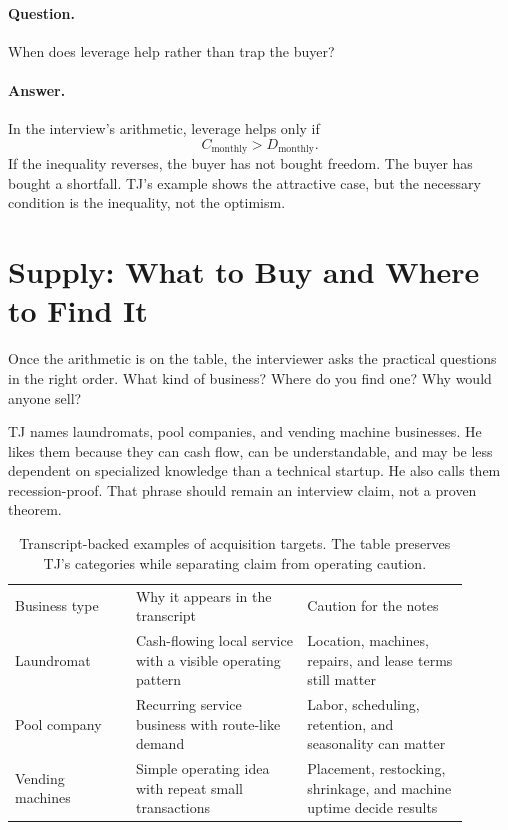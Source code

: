 \paragraph{Question.} When does leverage help rather than trap the buyer?

\paragraph{Answer.} In the interview's arithmetic, leverage helps only if
\begin{equation}
C_{\mathrm{monthly}}>D_{\mathrm{monthly}}.
\end{equation}
If the inequality reverses, the buyer has not bought freedom. The buyer has bought a shortfall. TJ's example shows the attractive case, but the necessary condition is the inequality, not the optimism.

\section{Supply: What to Buy and Where to Find It}

Once the arithmetic is on the table, the interviewer asks the practical questions in the right order. What kind of business? Where do you find one? Why would anyone sell?

TJ names laundromats, pool companies, and vending machine businesses. He likes them because they can cash flow, can be understandable, and may be less dependent on specialized knowledge than a technical startup. He also calls them recession-proof. That phrase should remain an interview claim, not a proven theorem.

\begin{table}
\centering
\begin{tabular}{p{0.24\linewidth}p{0.34\linewidth}p{0.32\linewidth}}
Business type & Why it appears in the transcript & Caution for the notes \\
Laundromat & Cash-flowing local service with a visible operating pattern & Location, machines, repairs, and lease terms still matter \\
Pool company & Recurring service business with route-like demand & Labor, scheduling, retention, and seasonality can matter \\
Vending machines & Simple operating idea with repeat small transactions & Placement, restocking, shrinkage, and machine uptime decide results \\
\end{tabular}
\caption{Transcript-backed examples of acquisition targets. The table preserves TJ's categories while separating claim from operating caution.}
\end{table}

